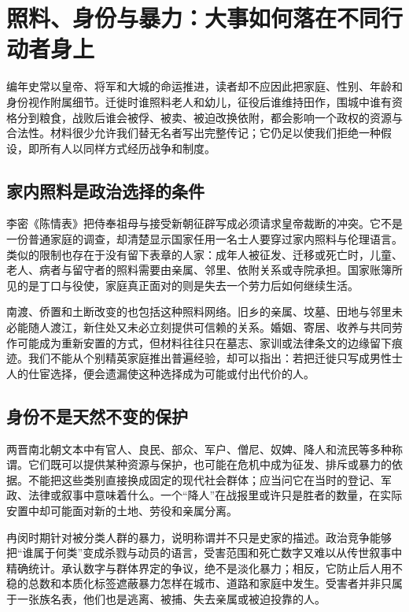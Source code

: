 \section{照料、身份与暴力：大事如何落在不同行动者身上}
\label{sec:synthesis-care-status-violence}

编年史常以皇帝、将军和大城的命运推进，读者却不应因此把家庭、性别、年龄和身份视作附属细节。迁徙时谁照料老人和幼儿，征役后谁维持田作，围城中谁有资格分到粮食，战败后谁会被俘、被卖、被迫改换依附，都会影响一个政权的资源与合法性。材料很少允许我们替无名者写出完整传记；它仍足以使我们拒绝一种假设，即所有人以同样方式经历战争和制度。

\subsection{家内照料是政治选择的条件}

李密《陈情表》把侍奉祖母与接受新朝征辟写成必须请求皇帝裁断的冲突。它不是一份普通家庭的调查，却清楚显示国家任用一名士人要穿过家内照料与伦理语言。类似的限制也存在于没有留下表章的人家：成年人被征发、迁移或死亡时，儿童、老人、病者与留守者的照料需要由亲属、邻里、依附关系或寺院承担。国家账簿所见的是丁口与役使，家庭真正面对的则是失去一个劳力后如何继续生活。

南渡、侨置和土断改变的也包括这种照料网络。旧乡的亲属、坟墓、田地与邻里未必能随人渡江，新住处又未必立刻提供可信赖的关系。婚姻、寄居、收养与共同劳作可能成为重新安置的方式，但材料往往只在墓志、家训或法律条文的边缘留下痕迹。我们不能从个别精英家庭推出普遍经验，却可以指出：若把迁徙只写成男性士人的仕宦选择，便会遗漏使这种选择成为可能或付出代价的人。

\subsection{身份不是天然不变的保护}

两晋南北朝文本中有官人、良民、部众、军户、僧尼、奴婢、降人和流民等多种称谓。它们既可以提供某种资源与保护，也可能在危机中成为征发、排斥或暴力的依据。不能把这些类别直接换成固定的现代社会群体；应当问它在当时的登记、军政、法律或叙事中意味着什么。一个“降人”在战报里或许只是胜者的数量，在实际安置中却可能面对新的土地、劳役和亲属分离。

冉闵时期针对被分类人群的暴力，说明称谓并不只是史家的描述。政治竞争能够把“谁属于何类”变成杀戮与动员的语言，受害范围和死亡数字又难以从传世叙事中精确统计。承认数字与群体界定的争议，绝不是淡化暴力；相反，它防止后人用不稳的总数和本质化标签遮蔽暴力怎样在城市、道路和家庭中发生。受害者并非只属于一张族名表，他们也是逃离、被捕、失去亲属或被迫投靠的人。

